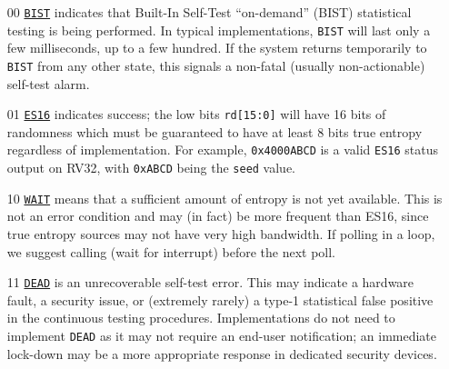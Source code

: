 \begin{itemize}
    \item[00]   \underline{\tt BIST}
    indicates that Built-In Self-Test ``on-demand'' (BIST) statistical
    testing is being performed. In typical implementations,
    \verb|BIST| will last only a few milliseconds, up to a few hundred.
    If the system returns temporarily to \verb|BIST| from any other state,
    this signals a non-fatal (usually non-actionable) self-test alarm.

    \item[01]   \underline{\tt ES16}
    indicates success; the low bits \verb|rd[15:0]| will have 16 bits
    of randomness which must be guaranteed to have at least 8 bits true
    entropy regardless of implementation. For example, \verb|0x4000ABCD|
    is a valid \verb|ES16| status output on RV32, with \verb|0xABCD| being
    the \verb|seed| value.

    \item[10]   \underline{\tt WAIT}
    means that a sufficient amount of entropy is not yet available.
    This is not an error condition and may (in fact) be more frequent than
    ES16, since true entropy sources may not have very high bandwidth.
    If polling in a loop, we suggest calling  (wait for 
    interrupt) before the next poll.

    \item[11]   \underline{\tt DEAD}
    is an unrecoverable self-test error. This may indicate a hardware
    fault, a security issue, or (extremely rarely) a type-1
    statistical false positive in the continuous testing procedures.
    Implementations do not need to implement \verb|DEAD| as it may not require
    an end-user notification; an immediate lock-down may be a more
    appropriate response in dedicated security devices.
\end{itemize}


